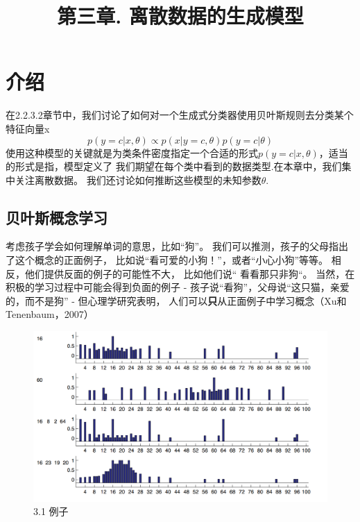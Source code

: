 \documentclass{article}
\title{ 第三章. 离散数据的生成模型}
\begin{document}
 \date{}
 \maketitle
 \setcounter{section}{2}
  \section{介绍}
  在2.2.3.2章节中，我们讨论了如何对一个生成式分类器使用贝叶斯规则去分类某个特征向量x
  \begin{equation}
    p(y = c|x,\theta)\propto p(x|y = c,\theta)p(y = c|\theta)
  \end{equation}
  使用这种模型的关键就是为类条件密度指定一个合适的形式$p(y = c|x,\theta)$，适当的形式是指，模型定义了
  我们期望在每个类中看到的数据类型.在本章中，我们集中关注离散数据。
我们还讨论如何推断这些模型的未知参数$\theta$.
   \subsection{贝叶斯概念学习}
   考虑孩子学会如何理解单词的意思，比如“狗”。
   我们可以推测，孩子的父母指出了这个概念的正面例子，
   比如说“看可爱的小狗！”，或者“小心小狗”等等。
   相反，他们提供反面的例子的可能性不大，
   比如他们说“ 看看那只非狗“。 当然，在积极的学习过程中可能会得到负面的例子 - 孩子说“看狗”，父母说“这只猫，亲爱的，而不是狗”
   - 但心理学研究表明，
   人们可以\textbf{只}从正面例子中学习概念（Xu和Tenenbaum，2007）
   \begin{figure}
    \centering
    \includegraphics[width=.9\textwidth]{./Picture/31.png} %
    \caption*{3.1 例子} %
    \label{img1} %
  \end{figure}
\end{document}
